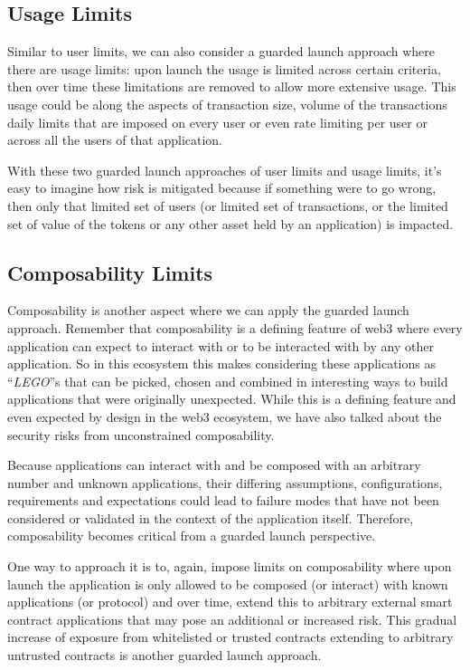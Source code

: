 \subsection{Usage Limits}\label{usage-limits}

Similar to user limits, we can also consider a guarded launch approach
where there are usage limits: upon launch the usage is limited across
certain criteria, then over time these limitations are removed to allow
more extensive usage. This usage could be along the aspects of
transaction size, volume of the transactions daily limits that are
imposed on every user or even rate limiting per user or across all the
users of that application.

With these two guarded launch approaches of user limits and usage
limits, it's easy to imagine how risk is mitigated because if something
were to go wrong, then only that limited set of users (or limited set of
transactions, or the limited set of value of the tokens or any other
asset held by an application) is impacted.

\subsection{Composability Limits}\label{composability-limits}

Composability is another aspect where we can apply the guarded launch
approach. Remember that composability is a defining feature of web3
where every application can expect to interact with or to be interacted
with by any other application. So in this ecosystem this makes
considering these applications as ``\emph{LEGO}''s that can be picked,
chosen and combined in interesting ways to build applications that were
originally unexpected. While this is a defining feature and even
expected by design in the web3 ecosystem, we have also talked about the
security risks from unconstrained composability.

Because applications can interact with and be composed with an arbitrary
number and unknown applications, their differing assumptions,
configurations, requirements and expectations could lead to failure
modes that have not been considered or validated in the context of the
application itself. Therefore, composability becomes critical from a
guarded launch perspective.

One way to approach it is to, again, impose limits on composability
where upon launch the application is only allowed to be composed (or
interact) with known applications (or protocol) and over time, extend
this to arbitrary external smart contract applications that may pose an
additional or increased risk. This gradual increase of exposure from
whitelisted or trusted contracts extending to arbitrary untrusted
contracts is another guarded launch approach.

